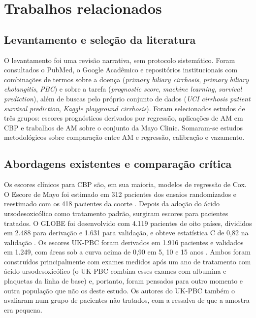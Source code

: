 \section{Trabalhos relacionados}\label{sec:relacionados}

\subsection{Levantamento e seleção da literatura}
O levantamento foi uma revisão narrativa, sem protocolo sistemático. Foram consultados o PubMed, o Google Acadêmico e repositórios institucionais com combinações de termos sobre a doença (\textit{primary biliary cirrhosis}, \textit{primary biliary cholangitis}, \textit{PBC}) e sobre a tarefa (\textit{prognostic score}, \textit{machine learning}, \textit{survival prediction}), além de buscas pelo próprio conjunto de dados (\textit{UCI cirrhosis patient survival prediction}, \textit{Kaggle playground cirrhosis}). Foram selecionados estudos de três grupos: escores prognósticos derivados por regressão, aplicações de AM em CBP e trabalhos de AM sobre o conjunto da Mayo Clinic. Somaram-se estudos metodológicos sobre comparação entre AM e regressão, calibração e vazamento.

\subsection{Abordagens existentes e comparação crítica}
Os escores clínicos para CBP são, em sua maioria, modelos de regressão de Cox. O Escore de Mayo foi estimado em 312 pacientes dos ensaios randomizados e reestimado com os 418 pacientes da coorte \cite{dickson1989prognosis}. Depois da adoção do ácido ursodesoxicólico como tratamento padrão, surgiram escores para pacientes tratados. O GLOBE foi desenvolvido com 4.119 pacientes de oito países, divididos em 2.488 para derivação e 1.631 para validação, e obteve estatística C de 0,82 na validação \cite{lammers2015globe}. Os escores UK-PBC foram derivados em 1.916 pacientes e validados em 1.249, com áreas sob a curva acima de 0,90 em 5, 10 e 15 anos \cite{carbone2016ukpbc}. Ambos foram construídos principalmente com exames medidos após um ano de tratamento com ácido ursodesoxicólico (o UK-PBC combina esses exames com albumina e plaquetas da linha de base) e, portanto, foram pensados para outro momento e outra população que não os deste estudo. Os autores do UK-PBC também o avaliaram num grupo de pacientes não tratados, com a ressalva de que a amostra era pequena.

